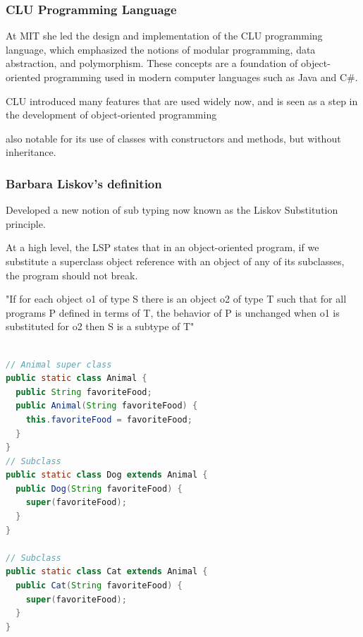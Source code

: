 \documentclass{beamer}
\begin{document}
\begin{frame}
\frametitle{CLU Programming Language}

At MIT she led the design and implementation of the CLU programming language, which emphasized the notions of modular programming, data abstraction, and polymorphism. These concepts are a foundation of object-oriented programming used in modern computer languages such as Java and C\#.

\vspace{5mm}

CLU introduced many features that are used widely now, and is seen as a step in the development of object-oriented programming 

\vspace{5mm}

also notable for its use of classes with constructors and methods, but without inheritance.

\end{frame}

\begin{frame}
\frametitle{Barbara Liskov's definition}

Developed a new notion of sub typing now known as the Liskov Substitution principle.

\vspace{5mm} %

At a high level, the LSP states that in an object-oriented program, if we substitute a superclass object reference with an object of any of its subclasses, the program should not break.\\

\vspace{5 mm}

"If for each object o1 of type S there is an object o2 of type T such that for all programs P defined in terms of T, the behavior of P is unchanged when o1 is substituted for o2 then S is a subtype of T"


\end{frame}




\vspace{5mm}

\begin{lstlisting}[language=Java]

// Animal super class 
public static class Animal {
  public String favoriteFood;
  public Animal(String favoriteFood) {
    this.favoriteFood = favoriteFood;
  }
}
// Subclass
public static class Dog extends Animal {
  public Dog(String favoriteFood) {
    super(favoriteFood);
  }
}

// Subclass
public static class Cat extends Animal {
  public Cat(String favoriteFood) {
    super(favoriteFood);
  }
}
\end{lstlisting}
\end{document}
